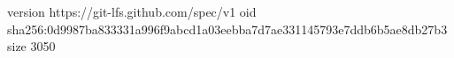 version https://git-lfs.github.com/spec/v1
oid sha256:0d9987ba833331a996f9abcd1a03eebba7d7ae331145793e7ddb6b5ae8db27b3
size 3050
